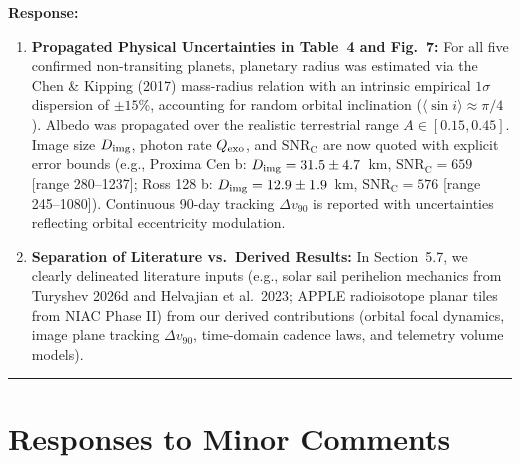 \documentclass[11pt]{article}
\begin{document}
\textbf{Response:}\\[1mm]
\begin{enumerate}
\item \textbf{Propagated Physical Uncertainties in Table~4 and Fig.~7:}
For all five confirmed non-transiting planets, planetary radius was estimated via the Chen \& Kipping (2017) mass-radius relation with an intrinsic empirical $1\sigma$ dispersion of $\pm 15\%$, accounting for random orbital inclination ($\langle \sin i \rangle \approx \pi/4$). Albedo was propagated over the realistic terrestrial range $A \in [0.15, 0.45]$. Image size $D_{\rm img}$, photon rate $Q_{\rm exo}$, and $\mathrm{SNR_C}$ are now quoted with explicit error bounds (e.g., Proxima Cen b: $D_{\rm img} = 31.5 \pm 4.7$~km, $\mathrm{SNR_C} = 659$ [range 280--1237]; Ross 128 b: $D_{\rm img} = 12.9 \pm 1.9$~km, $\mathrm{SNR_C} = 576$ [range 245--1080]). Continuous 90-day tracking $\Delta v_{90}$ is reported with uncertainties reflecting orbital eccentricity modulation.
\item \textbf{Separation of Literature vs.\ Derived Results:} In Section~5.7, we clearly delineated literature inputs (e.g., solar sail perihelion mechanics from Turyshev 2026d and Helvajian et al.\ 2023; APPLE radioisotope planar tiles from NIAC Phase II) from our derived contributions (orbital focal dynamics, image plane tracking $\Delta v_{90}$, time-domain cadence laws, and telemetry volume models).
\end{enumerate}

\vspace{4mm}
\hrule
\vspace{2mm}
\section*{Responses to Minor Comments}
\end{document}
